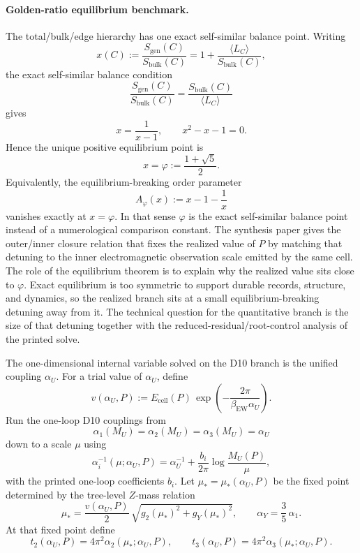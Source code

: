 \documentclass[11pt]{article}
\begin{document}
\paragraph{Golden-ratio equilibrium benchmark.}
The total/bulk/edge hierarchy has one exact self-similar balance point. Writing
\[
x(C):=\frac{S_{\mathrm{gen}}(C)}{S_{\mathrm{bulk}}(C)}
=
1+\frac{\langle L_C\rangle}{S_{\mathrm{bulk}}(C)},
\]
the exact self-similar balance condition
\[
\frac{S_{\mathrm{gen}}(C)}{S_{\mathrm{bulk}}(C)}
=
\frac{S_{\mathrm{bulk}}(C)}{\langle L_C\rangle}
\]
gives
\[
x=\frac{1}{x-1},
\qquad
x^2-x-1=0.
\]
Hence the unique positive equilibrium point is
\[
x=\varphi:=\frac{1+\sqrt5}{2}.
\]
Equivalently, the equilibrium-breaking order parameter
\[
A_\varphi(x):=x-1-\frac1x
\]
vanishes exactly at \(x=\varphi\). In that sense \(\varphi\) is the exact self-similar balance
point instead of a numerological comparison constant. The synthesis paper gives the outer/inner
closure relation that fixes the realized value of \(P\) by matching that detuning to the inner
electromagnetic observation scale emitted by the same cell. The role of the equilibrium theorem is
to explain why the realized value sits close to \(\varphi\). Exact equilibrium is too symmetric to
support durable records, structure, and dynamics, so the realized branch sits at a small
equilibrium-breaking detuning away from it. The technical question for the quantitative branch is
the size of that detuning together with the reduced-residual/root-control analysis of the printed
solve.

The one-dimensional internal variable solved on the D10 branch is the unified coupling \(\alpha_U\). For a trial value of \(\alpha_U\), define
\[
v(\alpha_U,P)
:=
E_{\mathrm{cell}}(P)\,
\exp\!\left(-\frac{2\pi}{\beta_{\mathrm{EW}}\alpha_U}\right).
\]
Run the one-loop D10 couplings from
\[
\alpha_1(M_U)=\alpha_2(M_U)=\alpha_3(M_U)=\alpha_U
\]
down to a scale \(\mu\) using
\[
\alpha_i^{-1}(\mu;\alpha_U,P)
=
\alpha_U^{-1}
+
\frac{b_i}{2\pi}\log\frac{M_U(P)}{\mu},
\]
with the printed one-loop coefficients \(b_i\). Let \(\mu_\ast=\mu_\ast(\alpha_U,P)\) be the fixed point determined by the tree-level \(Z\)-mass relation
\[
\mu_\ast
=
\frac{v(\alpha_U,P)}{2}\,
\sqrt{g_2(\mu_\ast)^2+g_Y(\mu_\ast)^2},
\qquad
\alpha_Y=\frac35\,\alpha_1.
\]
At that fixed point define
\[
t_2(\alpha_U,P)=4\pi^2\alpha_2(\mu_\ast;\alpha_U,P),
\qquad
t_3(\alpha_U,P)=4\pi^2\alpha_3(\mu_\ast;\alpha_U,P).
\]
\end{document}
